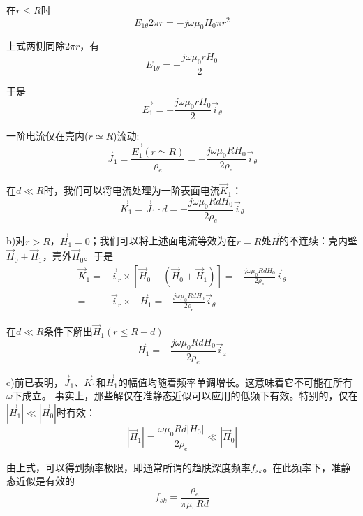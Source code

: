 在$r\le R$时
\begin{equation*}
E_{1\theta} 2\pi r = -j\omega \mu_0 H_0 \pi r^2 \tag{S7.2}
\end{equation*}

上式两侧同除$2\pi r$，有
\begin{equation*}
E_{1\theta} = -\frac{j\omega \mu_0 r H_0}{2} \tag{S7.3}
\end{equation*}

于是
\begin{equation*}
\vec{E_{1}} = -\frac{j\omega \mu_0 r H_0}{2}\vec{i}_\theta \tag{2.56}
\end{equation*}

一阶电流仅在壳内($r\simeq R$)流动:
\begin{equation*}
\vec{J}_1=\frac{\vec{E_{1}}(r\simeq R)}{\rho_e} = -\frac{j\omega \mu_0 R H_0}{2\rho_e}\vec{i}_\theta \tag{2.57}
\end{equation*}

在$d\ll R$时，我们可以将电流处理为一阶表面电流$\vec{K}_1$：
\begin{equation*}
\vec{K}_1=\vec{J}_1 \cdot d= -\frac{j\omega \mu_0 R d H_0}{2\rho_e}\vec{i}_\theta \tag{S7.4}
\end{equation*}

b)对$r>R$，$\vec{H}_1=0$；我们可以将上述面电流等效为在$r=R$处$\vec{H}$的不连续：壳内壁$\vec{H}_0+\vec{H}_1$，壳外$\vec{H}_0$。于是
\begin{align}
\vec{K}_1=&\vec{i}_r \times [\vec{H}_0-(\vec{H}_0+\vec{H}_1)]=-\frac{j\omega \mu_0 R d H_0}{2\rho_e}\vec{i}_\theta\nonumber\\
=&\vec{i}_r\times-\vec{H}_1=-\frac{j\omega \mu_0 R d H_0}{2\rho_e}\vec{i}_\theta\nonumber\tag{S7.5}
\end{align}

在$d\ll R$条件下解出$\vec{H}_1(r\le R-d)$
\begin{equation*}
\vec{H}_1=-\frac{j\omega \mu_0 R d H_0}{2\rho_e}\vec{i}_z \tag{2.58}
\end{equation*}

c)前已表明，$\vec{J}_1$、$\vec{K}_1$和$\vec{H}_1$的幅值均随着频率单调增长。这意味着它不可能在所有$\omega$下成立。
事实上，那些解仅在准静态近似可以应用的低频下有效。特别的，仅在$|\vec{H}_1|\ll |\vec{H}_0|$时有效：
\begin{equation*}
|\vec{H}_1|=\frac{\omega \mu_0 R d |H_0|}{2\rho_e}\ll |\vec{H}_0|\tag{S7.6}
\end{equation*}

由上式，可以得到频率极限，即通常所谓的趋肤深度频率$f_{sk}$。在此频率下，准静态近似是有效的
\begin{equation*}
f_{sk}=\frac{\rho_e}{\pi \mu_0 R d} \tag{2.59}
\end{equation*}

